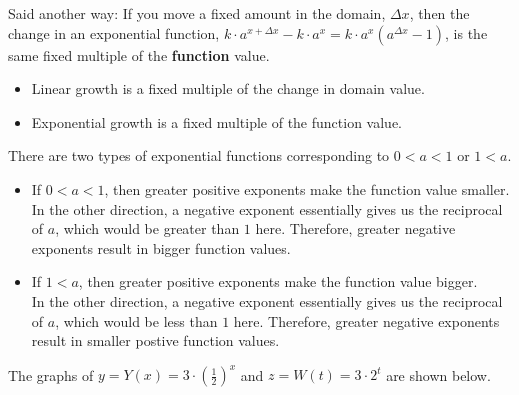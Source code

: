\documentclass{ximera}
\begin{document}
Said another way:  If you move a fixed amount in the domain, $\Delta x$, then the change in an exponential function, $k \cdot a^{x + \Delta x} - k \cdot a^x = k \cdot a^x (a^{\Delta x} - 1)$, is the same fixed multiple of the \textbf{function} value.

\begin{itemize}
\item Linear growth is a fixed multiple of the change in domain value.
\item Exponential growth is a fixed multiple of the function value. 
\end{itemize}





There are two types of exponential functions corresponding to $0<a<1$ or $1<a$.






\begin{itemize}
\item If $0<a<1$, then greater positive exponents make the function value smaller.   \\
In the other direction, a negative exponent essentially gives us the reciprocal of $a$, which would be greater than $1$ here.  Therefore, greater negative exponents result in bigger function values. \\

\item If $1<a$, then greater positive exponents make the function value bigger.   \\ 
In the other direction, a negative exponent essentially gives us the reciprocal of $a$, which would be less than $1$ here.  Therefore, greater negative exponents result in smaller postive function values.
\end{itemize}



The graphs of $y = Y(x) = 3 \cdot \left(\frac{1}{2}\right)^x$ and $z = W(t) = 3 \cdot 2^t$ are shown below.
\end{document}
